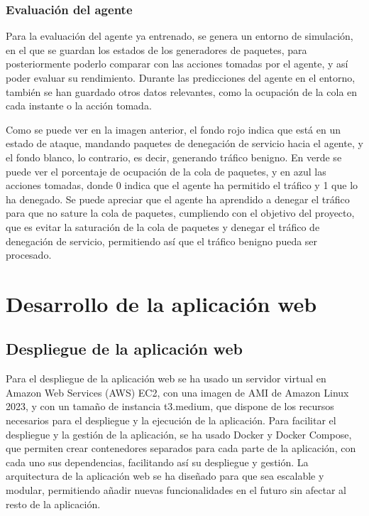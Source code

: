\subsubsection{Evaluación del agente}
Para la evaluación del agente ya entrenado, se genera un entorno de simulación, en el que se guardan los estados de los generadores de paquetes, para posteriormente poderlo comparar con las acciones tomadas por el agente, y así poder evaluar su rendimiento.
Durante las predicciones del agente en el entorno, también se han guardado otros datos relevantes, como la ocupación de la cola en cada instante o la acción tomada.


Como se puede ver en la imagen anterior, el fondo rojo indica que está en un estado de ataque, mandando paquetes de denegación de servicio hacia el agente, y el fondo blanco, lo contrario, es decir, generando tráfico benigno. En verde se puede ver el porcentaje de ocupación de la cola de paquetes, y en azul las acciones tomadas, donde 0 indica que el agente ha permitido el tráfico y 1 que lo ha denegado. Se puede apreciar que el agente ha aprendido a denegar el tráfico para que no sature la cola de paquetes, cumpliendo con el objetivo del proyecto, que es evitar la saturación de la cola de paquetes y denegar el tráfico de denegación de servicio, permitiendo así que el tráfico benigno pueda ser procesado.

\section{Desarrollo de la aplicación web}


\subsection{Despliegue de la aplicación web}
Para el despliegue de la aplicación web se ha usado un servidor virtual en Amazon Web Services (AWS) EC2, con una imagen de AMI de Amazon Linux 2023, y con un tamaño de instancia t3.medium, que dispone de los recursos necesarios para el despliegue y la ejecución de la aplicación.
Para facilitar el despliegue y la gestión de la aplicación, se ha usado Docker y Docker Compose, que permiten crear contenedores separados para cada parte de la aplicación, con cada uno sus dependencias, facilitando así su despliegue y gestión.
La arquitectura de la aplicación web se ha diseñado para que sea escalable y modular, permitiendo añadir nuevas funcionalidades en el futuro sin afectar al resto de la aplicación.


